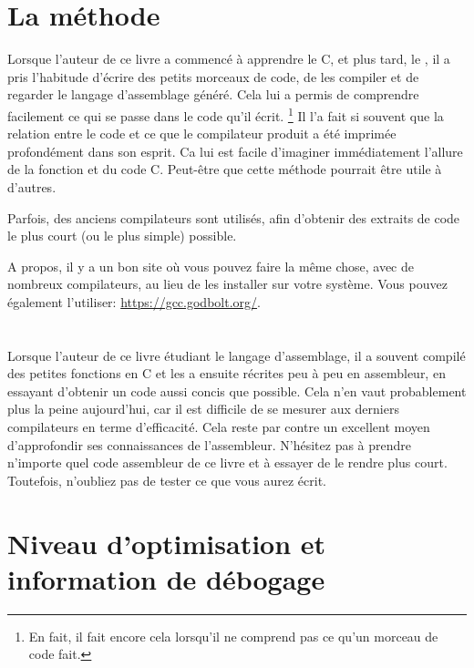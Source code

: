 ﻿\section{La méthode}

Lorsque l'auteur de ce livre a commencé à apprendre le C, et plus tard, le \Cpp, il a pris l'habitude d'écrire des petits morceaux de
code, de les compiler et de regarder le langage d'assemblage généré.
Cela lui a permis de comprendre facilement ce qui se passe dans le code qu'il écrit.
\footnote{En fait, il fait encore cela lorsqu'il ne comprend pas ce qu'un morceau de code fait.}
Il l'a fait si souvent que la relation entre le code \Cpp et ce que le compilateur produit a été imprimée profondément dans son
 esprit.
Ca lui est facile d'imaginer immédiatement l'allure de la fonction et du code C.
Peut-être que cette méthode pourrait être utile à d'autres.


Parfois, des anciens compilateurs sont utilisés, afin d'obtenir des extraits de code le plus court (ou le plus simple) possible.

A propos, il y a un bon site où vous pouvez faire la même chose, avec de nombreux
compilateurs, au lieu de les installer sur votre système.
Vous pouvez également l'utiliser: \url{https://gcc.godbolt.org/}.

\section*{\Exercises}

Lorsque l'auteur de ce livre étudiant le langage d'assemblage, il a souvent compilé des petites fonctions en C et les a ensuite
récrites peu à peu en assembleur, en essayant d'obtenir un code aussi concis que possible.
Cela n'en vaut probablement plus la peine aujourd'hui, car il est difficile
de se mesurer aux derniers compilateurs en terme d'efficacité. Cela reste par contre un excellent moyen d'approfondir ses connaissances
de l'assembleur.
N'hésitez pas à prendre n'importe quel code assembleur de ce livre et à essayer de le rendre plus court.
Toutefois, n'oubliez pas de tester ce que vous aurez écrit.

\section*{Niveau d'optimisation et information de débogage}

